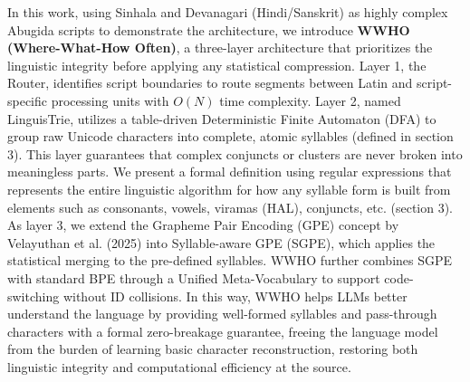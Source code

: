 In this work, using Sinhala and Devanagari (Hindi/Sanskrit) as highly complex Abugida scripts to demonstrate the architecture, we introduce \textbf{WWHO (Where-What-How Often)}, a three-layer architecture that prioritizes the linguistic integrity before applying any statistical compression.  Layer 1, the Router, identifies script boundaries to route segments between Latin and script-specific processing units with $O(N)$ time complexity. Layer 2, named LinguisTrie, utilizes a table-driven Deterministic Finite Automaton (DFA) to group raw Unicode characters into complete, atomic syllables (defined in section 3). This layer guarantees that complex conjuncts or clusters are never broken into meaningless parts. We present a formal definition using regular expressions that represents the entire linguistic algorithm for how any syllable form is built from elements such as consonants, vowels, viramas (HAL), conjuncts, etc. (section 3). As layer 3, we extend the Grapheme Pair Encoding (GPE) concept by Velayuthan et al. (2025) \cite{velayuthan2025gpe} into Syllable-aware GPE (SGPE), which applies the statistical merging to the pre-defined syllables. WWHO further combines SGPE with standard BPE through a Unified Meta-Vocabulary to support code-switching without ID collisions. In this way, WWHO helps LLMs better understand the language by providing well-formed syllables and pass-through characters with a formal zero-breakage guarantee, freeing the language model from the burden of learning basic character reconstruction, restoring both linguistic integrity and computational efficiency at the source.